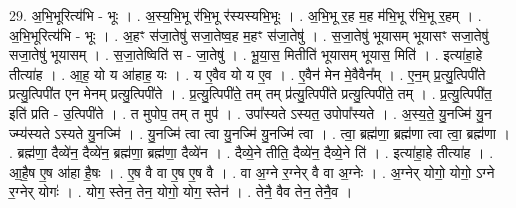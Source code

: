 \documentclass[17pt]{extarticle}
\begin{document}
29. अ॒भि॒भूरित्य॑भि - भूः । . अ॒स्य॒भि॒भू र॑भि॒भू र॑स्यस्यभि॒भूः । . अ॒भि॒भू र॒ह म॒ह म॑भि॒भू र॑भि॒भू र॒हम् । . अ॒भि॒भूरित्य॑भि - भूः । . अ॒हꣳ स॑जा॒तेषु॑ सजा॒तेष्व॒ह म॒हꣳ स॑जा॒तेषु॑ । . स॒जा॒तेषु॑ भूयासम् भूयासꣳ सजा॒तेषु॑ सजा॒तेषु॑ भूयासम् । . स॒जा॒तेष्विति॑ स - जा॒तेषु॑ । . भू॒या॒स॒ मितीति॑ भूयासम् भूयास॒ मिति॑ । . इत्या॑हा॒हे तीत्या॑ह । . आ॒ह॒ यो य आ॑हाह॒ यः । . य ए॒वैव यो य ए॒व । . ए॒वैन॑ मेन मे॒वैवैन᳚म् । . ए॒न॒म् प्र॒त्यु॒त्पिपी॑ते प्रत्यु॒त्पिपी॑त एन मेनम् प्रत्यु॒त्पिपी॑ते । . प्र॒त्यु॒त्पिपी॑ते॒ तम् तम् प्र॑त्यु॒त्पिपी॑ते प्रत्यु॒त्पिपी॑ते॒ तम् । . प्र॒त्यु॒त्पिपी॑त॒ इति॑ प्रति - उ॒त्पिपी॑ते । . त मुपोप॒ तम् त मुप॑ । . उपा᳚स्यते ऽस्यत॒ उपोपा᳚स्यते । . अ॒स्य॒ते॒ यु॒नज्मि॑ यु॒न ज्म्य॑स्यते ऽस्यते यु॒नज्मि॑ । . यु॒नज्मि॑ त्वा त्वा यु॒नज्मि॑ यु॒नज्मि॑ त्वा । . त्वा॒ ब्रह्म॑णा॒ ब्रह्म॑णा त्वा त्वा॒ ब्रह्म॑णा । . ब्रह्म॑णा॒ दैव्ये॑न॒ दैव्ये॑न॒ ब्रह्म॑णा॒ ब्रह्म॑णा॒ दैव्ये॑न । . दैव्ये॒ने तीति॒ दैव्ये॑न॒ दैव्ये॒ने ति॑ । . इत्या॑हा॒हे तीत्या॑ह । . आ॒है॒ष ए॒ष आ॑हा है॒षः । . ए॒ष वै वा ए॒ष ए॒ष वै । . वा अ॒ग्ने र॒ग्नेर् वै वा अ॒ग्नेः । . अ॒ग्नेर् योगो॒ योगो॒ ऽग्ने र॒ग्नेर् योगः॑ । . योग॒ स्तेन॒ तेन॒ योगो॒ योग॒ स्तेन॑ । . तेनै॒ वैव तेन॒ तेनै॒व । \newline
\end{document}
